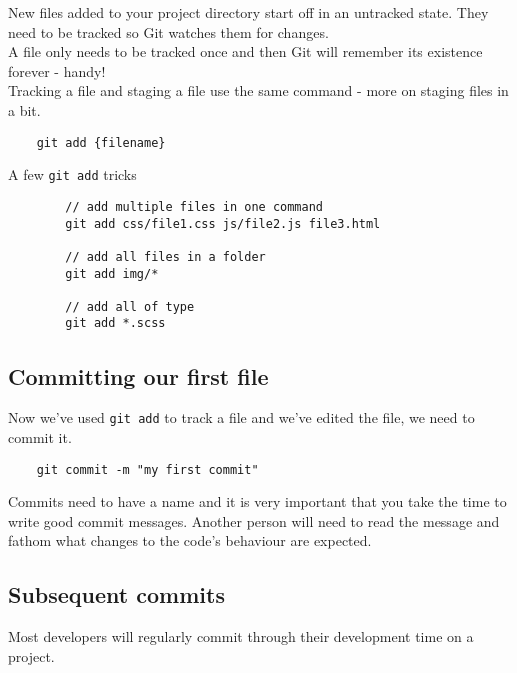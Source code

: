 New files added to your project directory start off in an untracked state. They need to be tracked so Git watches them for changes.
\\

A file only needs to be tracked once and then Git will remember its existence forever - handy!
\\

Tracking a file and staging a file use the same command - more on staging files in a bit.

\begin{verbatim}
    git add {filename}
\end{verbatim}

\begin{infobox}{A few \texttt{git add} tricks}
    \begin{verbatim}
        // add multiple files in one command
        git add css/file1.css js/file2.js file3.html

        // add all files in a folder
        git add img/*

        // add all of type
        git add *.scss
    \end{verbatim}
\end{infobox}


\subsection{Committing our first file}

Now we've used \texttt{git add} to track a file and we've edited the file, we need to commit it.

\begin{verbatim}
    git commit -m "my first commit"
\end{verbatim}

Commits need to have a name and it is very important that you take the time to write good commit messages. Another person will need to read the message and fathom what changes to the code's behaviour are expected.
\\


\subsection{Subsequent commits}

Most developers will regularly commit through their development time on a project.

